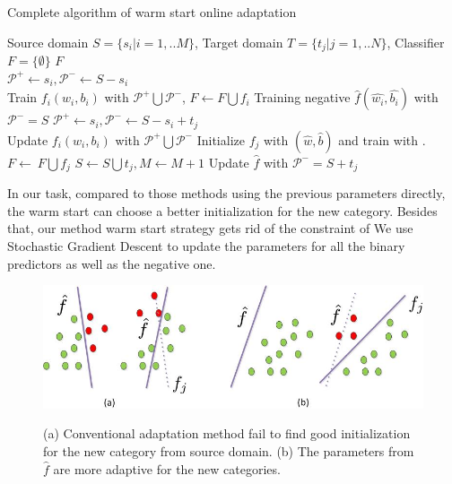 \begin{algorithm}
  \caption{Complete algorithm of warm start online adaptation}\label{algo:ws}
  \begin{algorithmic}[1]
    \REQUIRE Source domain $S = \{ {s_i}|i = 1,..M\} $, Target domain $T = \{ {t_j}|j = 1,..N\} $, Classifier $F = \{\emptyset\}$
    \ENSURE $F$\\
         \STATE $\mathcal{P^+}\leftarrow s_i, \mathcal{P^-}\leftarrow S-s_i$\\
          Train ${{f_i}\left( {{w_i},{b_i}} \right)}$ with $\mathcal{P^+}\bigcup\mathcal{P^-}$, $F\leftarrow F\bigcup f_i$
    \ENDFOR
    \STATE Training negative $\hat{f}\left( {\hat{w_i},\hat{b_i}} \right)$ with $\mathcal{P^-}=S$
             \STATE $\mathcal{P^+}\leftarrow s_i, \mathcal{P^-}\leftarrow S-s_i+t_j$ \\
              Update ${{f_i}\left( {{w_i},{b_i}} \right)}$ with $\mathcal{P^+}\bigcup\mathcal{P^-}$
        \ENDFOR
        \STATE Initialize $f_j$ with $(\hat{w},\hat{b})$ and train with .
        \STATE $F\leftarrow\ F\bigcup f_j$
        \STATE $S\leftarrow S\bigcup t_j, M\leftarrow M+1$
        \STATE Update $\hat{f}$ with $\mathcal{P^-}=S+t_j$
     \ENDWHILE
  \end{algorithmic}
\end{algorithm}

In our task, compared to those methods using the previous parameters directly, the warm start can choose a better initialization for the new category.  Besides that, our method warm start strategy gets rid of the constraint of  
We use Stochastic Gradient Descent to update the parameters for all the binary predictors as well as the negative one.
\begin{figure}
  \centering
  \includegraphics[scale = .6]{fig/domain.jpg}\\
  \caption{(a) Conventional adaptation method fail to find good initialization for the new category from source domain. (b) The parameters from $\hat{f}$ are more adaptive for the new categories.}
  \label{fig:wm}
\end{figure}


